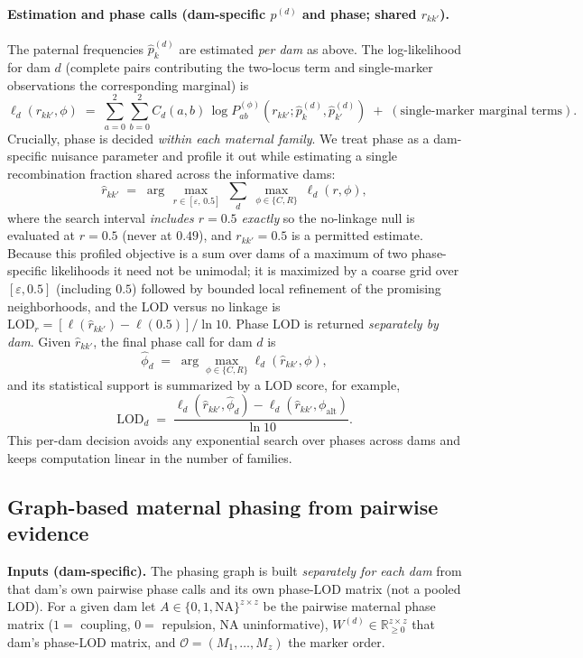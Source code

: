 \documentclass[11pt]{article}
\begin{document}
\paragraph{Estimation and phase calls (dam-specific $p^{(d)}$ and phase; shared $r_{kk'}$).}
The paternal frequencies $\hat p_k^{(d)}$ are estimated \emph{per dam} as above. The log-likelihood
for dam $d$ (complete pairs contributing the two-locus term and single-marker observations the
corresponding marginal) is
\[
\ell_d(r_{kk'},\phi) \;=\; \sum_{a=0}^{2}\sum_{b=0}^{2} C_d(a,b)\,\log P^{(\phi)}_{ab}(r_{kk'};\hat p_k^{(d)},\hat p_{k'}^{(d)}) \;+\; (\text{single-marker marginal terms}).
\]
Crucially, phase is decided \emph{within each maternal family}. We treat phase as a dam-specific nuisance parameter and profile it out while estimating a single recombination fraction shared across the informative dams:
\[
\hat r_{kk'} \;=\; \arg\max_{\,r\in[\varepsilon,\,0.5]}\ \sum_{d}\ \max_{\phi\in\{C,R\}}\ \ell_d(r,\phi),
\]
where the search interval \emph{includes $r=0.5$ exactly} so the no-linkage null is evaluated at
$r=0.5$ (never at $0.49$), and $r_{kk'}=0.5$ is a permitted estimate. Because this profiled
objective is a sum over dams of a maximum of two phase-specific likelihoods it need not be unimodal;
it is maximized by a coarse grid over $[\varepsilon,0.5]$ (including $0.5$) followed by bounded local
refinement of the promising neighborhoods, and the LOD versus no linkage is
$\mathrm{LOD}_r = [\ell(\hat r_{kk'})-\ell(0.5)]/\ln 10$. Phase LOD is returned \emph{separately by
dam}. Given $\hat r_{kk'}$, the final phase call for dam $d$ is
\[
\hat\phi_d \;=\; \arg\max_{\phi\in\{C,R\}} \ell_d(\hat r_{kk'},\phi),
\]
and its statistical support is summarized by a LOD score, for example,
\[
\mathrm{LOD}_d \;=\; \frac{\ell_d(\hat r_{kk'},\hat\phi_d)-\ell_d(\hat r_{kk'},\phi_{\mathrm{alt}})}{\ln 10}.
\]
This per-dam decision avoids any exponential search over phases across dams and keeps computation linear in the number of families.

\subsection{Graph-based maternal phasing from pairwise evidence} \label{sec:graph_phase}

\noindent\textbf{Inputs (dam-specific).}
The phasing graph is built \emph{separately for each dam} from that dam's own pairwise phase calls
and its own phase-LOD matrix (not a pooled LOD). For a given dam let \(A\in\{0,1,\text{NA}\}^{z\times z}\)
be the pairwise maternal phase matrix (\(1=\) coupling, \(0=\) repulsion, NA uninformative),
\(W^{(d)}\in\mathbb{R}_{\ge 0}^{z\times z}\) that dam's phase-LOD matrix, and
\(\mathcal{O}=(M_1,\ldots,M_z)\) the marker order.
\end{document}

